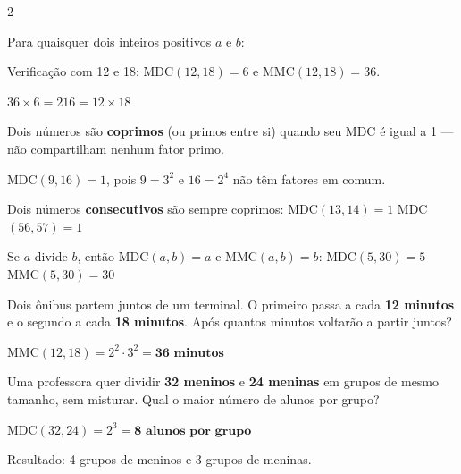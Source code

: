 \documentclass[12pt]{article}
\begin{document}
\begin{multicols}{2}

Para quaisquer dois inteiros positivos $a$ e $b$:


\vspace{0.2cm}
Verificação com 12 e 18: MDC$(12,18) = 6$ e MMC$(12,18) = 36$.

$36 \times 6 = 216 = 12 \times 18$ \checkmark


Dois números são \textbf{coprimos} (ou primos entre si) quando seu MDC é igual a 1 — não compartilham nenhum fator primo.

MDC$(9, 16) = 1$, pois $9 = 3^2$ e $16 = 2^4$ não têm fatores em comum.


Dois números \textbf{consecutivos} são sempre coprimos:
MDC$(13, 14) = 1$ \quad MDC$(56, 57) = 1$

Se $a$ divide $b$, então MDC$(a,b) = a$ e MMC$(a,b) = b$:
MDC$(5, 30) = 5$ \quad MMC$(5, 30) = 30$



Dois ônibus partem juntos de um terminal. O primeiro passa a cada \textbf{12 minutos} e o segundo a cada \textbf{18 minutos}. Após quantos minutos voltarão a partir juntos?

MMC$(12, 18) = 2^2 \cdot 3^2 = \textbf{36 minutos}$


Uma professora quer dividir \textbf{32 meninos} e \textbf{24 meninas} em grupos de mesmo tamanho, sem misturar. Qual o maior número de alunos por grupo?

MDC$(32, 24) = 2^3 = \textbf{8 alunos por grupo}$

Resultado: 4 grupos de meninos e 3 grupos de meninas.

\end{multicols}


\end{document}

